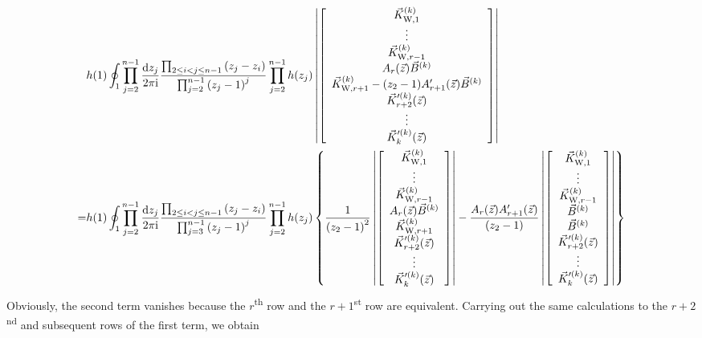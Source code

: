 \documentclass[cmp]{svjour}
\numberwithin{theorem}{section}
\numberwithin{equation}{section}
\def\dd{{\rm d}}
\def\ii{{\rm i}}
\begin{document}
\begin{equation*}
\begin{split}
& h(1) \oint_{1} \prod_{j=2}^{n-1}{ \frac{\dd z_j}{2 \pi \ii} } \frac{ \prod_{2 \leq i < j \leq n-1}{(z_j - z_i)} }{ \prod_{j=2}^{n-1}{{(z_j -1)}^{j}} } \prod_{j=2}^{n-1}{h(z_j)} 
\left|
\left[
\begin{array}{c}
\vec{K}^{(k)}_{\mathrm{W},1} \\
\vdots \\
\vec{K}^{(k)}_{\mathrm{W},r -1} \\
 A_r (\vec{z}) \vec{B}^{(k)}   \\
\vec{K}^{(k)}_{\mathrm{W}, r +1} - (z_2 - 1) A'_{r +1}(\vec{z}) \vec{B}^{(k)} \\
\vec{K}'^{(k)}_{r +2}(\vec{z}) \\
\vdots  \\
\vec{K}'^{(k)}_{k}(\vec{z})
\end{array}
\right]
\right| \\
= & h(1) \oint_{1} \prod_{j=2}^{n-1}{ \frac{\dd z_j}{2 \pi \ii} } \frac{ \prod_{2 \leq i < j \leq n-1}{(z_j - z_i)} }{ \prod_{j=3}^{n-1}{{(z_j -1)}^{j}} } \prod_{j=2}^{n-1}{h(z_j)}
\left\{ \frac{1}{{(z_2 - 1)}^2}
 \left|
 \left[
\begin{array}{c}
\vec{K}^{(k)}_{\mathrm{W},1} \\
\vdots \\
\vec{K}^{(k)}_{\mathrm{W},r -1} \\
 A_r (\vec{z}) \vec{B}^{(k)} \\
\vec{K}^{(k)}_{\mathrm{W}, r +1}   \\
\vec{K}'^{(k)}_{r +2}(\vec{z}) \\
\vdots \\
\vec{K}'^{(k)}_{k}(\vec{z})
\end{array}
\right]
\right| 
-  \frac{A_r (\vec{z}) A'_{r +1}(\vec{z})}{(z_2 - 1)}
 \left|
 \left[
\begin{array}{c}
\vec{K}^{(k)}_{\mathrm{W},1} \\
\vdots \\
\vec{K}^{(k)}_{\mathrm{W},r -1} \\
 \vec{B}^{(k)} \\
 \vec{B}^{(k)}  \\
 \vec{K}'^{(k)}_{r +2}(\vec{z}) \\
 \vdots  \\
\vec{K}'^{(k)}_{k}(\vec{z})
\end{array}
\right]
\right| \right\}
\end{split}
\end{equation*}
Obviously, the second term vanishes because the $r$\textsuperscript{th} row and the $r+1$\textsuperscript{st} row are equivalent.
Carrying out the same calculations to the $r+2$\textsuperscript{nd} and subsequent rows of the first term, we obtain
\end{document}
